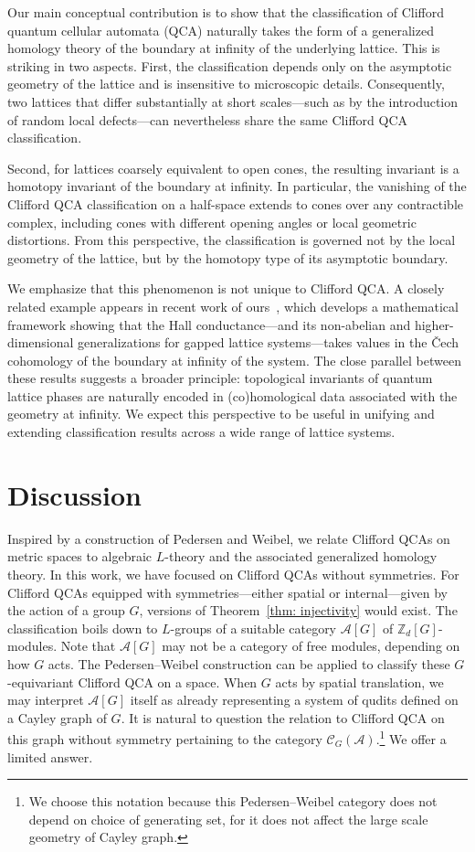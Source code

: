 \documentclass{article}
\theoremstyle{definition}
\newcommand{\CA}{{ \mathcal A}}
\newcommand{\ZZ}{{\mathbb Z}}
\begin{document}
Our main conceptual contribution is to show that the classification of Clifford quantum cellular automata (QCA) naturally takes the form of a generalized homology theory of the boundary at infinity of the underlying lattice. This is striking in two aspects. First, the classification depends only on the asymptotic geometry of the lattice and is insensitive to microscopic details. Consequently, two lattices that differ substantially at short scales—such as by the introduction of random local defects—can nevertheless share the same Clifford QCA classification.

Second, for lattices coarsely equivalent to open cones, the resulting invariant is a homotopy invariant of the boundary at infinity. In particular, the vanishing of the Clifford QCA classification on a half-space extends to cones over any contractible complex, including cones with different opening angles or local geometric distortions. From this perspective, the classification is governed not by the local geometry of the lattice, but by the homotopy type of its asymptotic boundary.

We emphasize that this phenomenon is not unique to Clifford QCA. A closely related example appears in recent work of ours~\cite{artymowicz2024mathematical}, which develops a mathematical framework showing that the Hall conductance—and its non-abelian and higher-dimensional generalizations for gapped lattice systems—takes values in the \v{C}ech cohomology of the boundary at infinity of the system. The close parallel between these results suggests a broader principle: topological invariants of quantum lattice phases are naturally encoded in (co)homological data associated with the geometry at infinity. We expect this perspective to be useful in unifying and extending classification results across a wide range of lattice systems.

\section{Discussion}
Inspired by a construction of Pedersen and Weibel, we relate Clifford QCAs on metric spaces to algebraic \( L \)-theory and the associated generalized homology theory. In this work, we have focused on Clifford QCAs without symmetries. For Clifford QCAs equipped with symmetries—either spatial or internal—given by the action of a group \( G \), versions of Theorem~\ref{thm: injectivity} would exist. The classification boils down to $L$-groups of a suitable category $\CA[G]$ of \( \ZZ_d[G] \)-modules. Note that $\CA[G]$ may not be a category of free modules, depending on how \( G \) acts. The Pedersen--Weibel construction can be applied to classify these $G$-equivariant Clifford QCA on a space. When $G$ acts by spatial translation, we may interpret $\CA[G]$ itself as already representing a system of qudits defined on a Cayley graph of $G$. It is natural to question the relation to Clifford QCA on this graph without symmetry pertaining to the category $\mathcal C_G(\CA)$.\footnote{We choose this notation because this Pedersen--Weibel category does not depend on choice of generating set, for it does not affect the large scale geometry of Cayley graph.} We offer a limited answer.
\end{document}
